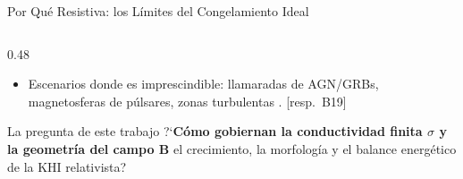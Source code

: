 \documentclass[aspectratio=169,9pt]{beamer}
\begin{document}
\begin{frame}{Por Qu\'e Resistiva: los L\'imites del Congelamiento Ideal}
\begin{columns}[T]
\begin{column}{0.48\textwidth}
\begin{tcolorbox}[RES={Lo que habilita la resistividad f\'isica}]
\begin{itemize}
            $E_{\rm mag}\!\to\!$ calor.
      \item Escenarios donde es imprescindible: llamaradas de AGN/GRBs,
            magnetosferas de p\'ulsares, zonas turbulentas
            \citep{palenzuela-2009,miranda-aranguren-2018}.
            \hfill{\tiny[resp.\ B19]}
    \end{itemize}
  \end{tcolorbox}
  \pause\vspace{0.12cm}
  \begin{block}{La pregunta de este trabajo}
    \scriptsize
    ?`\textbf{C\'omo gobiernan la conductividad finita $\sigma$ y la geometr\'ia
    del campo $\mathbf B$} el crecimiento, la morfolog\'ia y el balance
    energ\'etico de la KHI relativista?
  \end{block}
\end{column}
\end{columns}
\end{frame}
\end{document}
